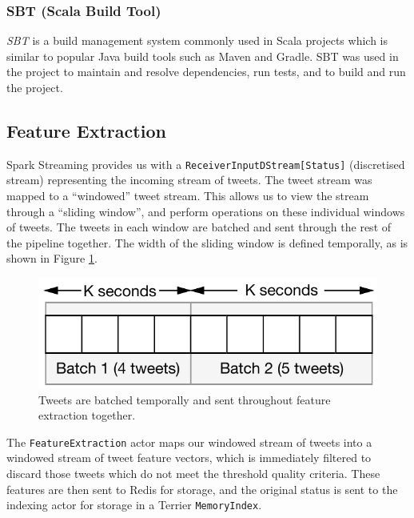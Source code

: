 \documentclass{l4proj}
\newcommand{\code}[1]{\texttt{#1}}
\begin{document}
             \subsubsection{SBT (Scala Build Tool)}
         \textit{SBT} is a build management system commonly used in Scala projects which is similar to popular Java build tools such as Maven and Gradle. SBT was used in the project to maintain and resolve dependencies, run tests, and to build and run the project.

    
    
    \subsection{Feature Extraction}
        
        Spark Streaming provides us with a \code{ReceiverInputDStream[Status]} (discretised stream) representing the incoming stream of tweets. The tweet stream was mapped to a ``windowed'' tweet stream. This allows us to view the stream through a ``sliding window'', and perform operations on these individual windows of tweets. The tweets in each window are batched and sent through the rest of the pipeline together. The width of the sliding window is defined temporally, as is shown in Figure \ref{slidingwindow}.
        
\begin{figure}
\centering
\includegraphics[scale=0.8]{slidingwindow.pdf}
\caption{Tweets are batched temporally and sent throughout feature extraction together.}
\label{slidingwindow}
\end{figure}

        The \code{FeatureExtraction} actor maps our windowed stream of tweets into a windowed stream of tweet feature vectors, which is immediately filtered to discard those tweets which do not meet the threshold quality criteria. These features are then sent to Redis for storage, and the original status is sent to the indexing actor for storage in a Terrier \code{MemoryIndex}.
        
\end{document}
